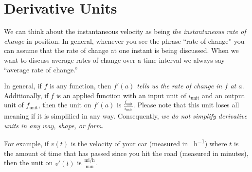 \documentclass[10pt,oneside,]{book}
\theoremstyle{plain}
\theoremstyle{definition}
\numberwithin{equation}{section}
\newcommand{\fe}[2]{#1\mathopen{}\left(#2\right)\mathclose{}}
\newcommand{\fd}[1]{#1'}
\begin{document}
\section[Derivative Units]{Derivative Units}\label{section-derivative-units}
We can think about the instantaneous velocity as being \emph{the instantaneous rate of change} in position. In general, whenever you see the phrase ``rate of change'' you can assume that the rate of change at one instant is being discussed. When we want to discuss average rates of change over a time interval we always say ``average rate of change.''%
\par
In general, if \(f\) is any function, then \emph{\(\fe{\fd{f}}{a}\) tells us the rate of change in \(f\) at \(a\)}. Additionally, if \(f\) is an applied function with an input unit of \(i_{\text{unit}}\) and an output unit of \(f_{\text{unit}}\), then the unit on \(\fe{\fd{f}}{a}\) is \(\frac{f_{\text{unit}}}{i_{\text{unit}}}\). Please note that this unit loses all meaning if it is simplified in any way. Consequently, \emph{we do not simplify derivative units in any way, shape, or form}.%
\par
For example, if \(\fe{v}{t}\) is the velocity of your car (measured in \si{\mile\per\hour}) where \(t\) is the amount of time that has passed since you hit the road (measured in minutes), then the unit on \(\fe{\fd{v}}{t}\) is \(\frac{\text{mi}/\text{h}}{\text{min}}\).%
\typeout{************************************************}
\typeout{************************************************}
\end{document}
